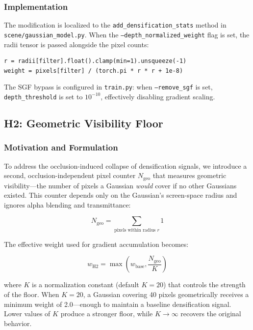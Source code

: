 \documentclass[conference]{IEEEtran}
\begin{document}
\subsubsection{Implementation}

The modification is localized to the \texttt{add\_densification\_stats} method in \texttt{scene/gaussian\_model.py}. When the \texttt{--depth\_normalized\_weight} flag is set, the radii tensor is passed alongside the pixel counts:

\begin{verbatim}
r = radii[filter].float().clamp(min=1).unsqueeze(-1)
weight = pixels[filter] / (torch.pi * r * r + 1e-8)
\end{verbatim}

The SGF bypass is configured in \texttt{train.py}: when \texttt{--remove\_sgf} is set, \texttt{depth\_threshold} is set to $10^{-10}$, effectively disabling gradient scaling.

\subsection{H2: Geometric Visibility Floor}

\subsubsection{Motivation and Formulation}

To address the occlusion-induced collapse of densification signals, we introduce a second, occlusion-independent pixel counter $N_{\text{geo}}$ that measures geometric visibility—the number of pixels a Gaussian \emph{would} cover if no other Gaussians existed. This counter depends only on the Gaussian's screen-space radius and ignores alpha blending and transmittance:

\begin{equation}
N_{\text{geo}} = \sum_{\text{pixels within radius } r} 1
\end{equation}

The effective weight used for gradient accumulation becomes:

\begin{equation}
w_{\text{H2}} = \max\left(w_{\text{base}}, \frac{N_{\text{geo}}}{K}\right)
\end{equation}

where $K$ is a normalization constant (default $K = 20$) that controls the strength of the floor. When $K = 20$, a Gaussian covering 40 pixels geometrically receives a minimum weight of 2.0—enough to maintain a baseline densification signal. Lower values of $K$ produce a stronger floor, while $K \to \infty$ recovers the original behavior.
\end{document}
